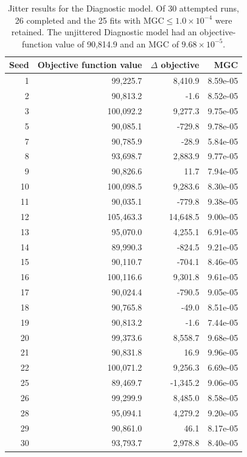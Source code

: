 \begin{table}[htbp]
\centering
\caption{Jitter results for the Diagnostic model. Of 30 attempted runs, 26 completed and the 25 fits with $\mathrm{MGC} \leq 1.0 \times 10^{-4}$ were retained. The unjittered Diagnostic model had an objective-function value of 90,814.9 and an MGC of $9.68 \times 10^{-5}$.}
\label{tab:jitter-diagnostic-model}
\small
\setlength{\tabcolsep}{7pt}
\renewcommand{\arraystretch}{1.08}
\begin{tabular}{rrrr}
\toprule
Seed & Objective function value & $\Delta$ objective & MGC \\
\midrule
1 & 99,225.7 & 8,410.9 & 8.59e-05 \\
2 & 90,813.2 & -1.6 & 8.52e-05 \\
3 & 100,092.2 & 9,277.3 & 9.75e-05 \\
5 & 90,085.1 & -729.8 & 9.78e-05 \\
7 & 90,785.9 & -28.9 & 5.84e-05 \\
8 & 93,698.7 & 2,883.9 & 9.77e-05 \\
9 & 90,826.6 & 11.7 & 7.94e-05 \\
10 & 100,098.5 & 9,283.6 & 8.30e-05 \\
11 & 90,035.1 & -779.8 & 9.38e-05 \\
12 & 105,463.3 & 14,648.5 & 9.00e-05 \\
13 & 95,070.0 & 4,255.1 & 6.91e-05 \\
14 & 89,990.3 & -824.5 & 9.21e-05 \\
15 & 90,110.7 & -704.1 & 8.46e-05 \\
16 & 100,116.6 & 9,301.8 & 9.61e-05 \\
17 & 90,024.4 & -790.5 & 9.05e-05 \\
18 & 90,765.8 & -49.0 & 8.51e-05 \\
19 & 90,813.2 & -1.6 & 7.44e-05 \\
20 & 99,373.6 & 8,558.7 & 9.68e-05 \\
21 & 90,831.8 & 16.9 & 9.96e-05 \\
22 & 100,071.2 & 9,256.3 & 6.69e-05 \\
25 & 89,469.7 & -1,345.2 & 9.06e-05 \\
26 & 99,299.9 & 8,485.0 & 8.58e-05 \\
28 & 95,094.1 & 4,279.2 & 9.20e-05 \\
29 & 90,861.0 & 46.1 & 8.17e-05 \\
30 & 93,793.7 & 2,978.8 & 8.40e-05 \\
\bottomrule
\end{tabular}
\end{table}
